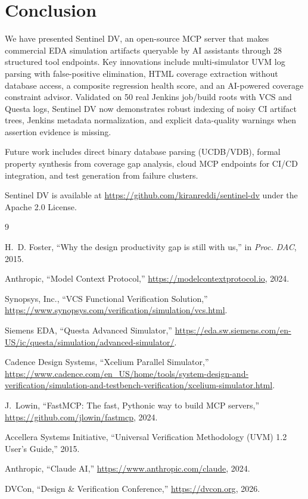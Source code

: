 \documentclass[10pt,twocolumn]{article}
\begin{document}
\section{Conclusion}

We have presented Sentinel DV, an open-source MCP server that makes commercial EDA
simulation artifacts queryable by AI assistants through 28 structured tool
endpoints. Key innovations include multi-simulator UVM log parsing with
false-positive elimination, HTML coverage extraction without database access, a
composite regression health score, and an AI-powered coverage constraint advisor.
Validated on 50 real Jenkins job/build roots with VCS and Questa logs, Sentinel
DV now demonstrates robust indexing of noisy CI artifact trees, Jenkins metadata
normalization, and explicit data-quality warnings when assertion evidence is
missing.

Future work includes direct binary database parsing (UCDB/VDB), formal property
synthesis from coverage gap analysis, cloud MCP endpoints for CI/CD integration,
and test generation from failure clusters.

Sentinel DV is available at \url{https://github.com/kiranreddi/sentinel-dv}
under the Apache 2.0 License.

\small
\begin{thebibliography}{9}

H.~D. Foster, ``Why the design productivity gap is still with us,''
in \textit{Proc. DAC}, 2015.

Anthropic, ``Model Context Protocol,'' \url{https://modelcontextprotocol.io}, 2024.

Synopsys, Inc., ``VCS Functional Verification Solution,''
\url{https://www.synopsys.com/verification/simulation/vcs.html}.

Siemens EDA, ``Questa Advanced Simulator,''
\url{https://eda.sw.siemens.com/en-US/ic/questa/simulation/advanced-simulator/}.

Cadence Design Systems, ``Xcelium Parallel Simulator,''
\url{https://www.cadence.com/en_US/home/tools/system-design-and-verification/simulation-and-testbench-verification/xcelium-simulator.html}.

J.~Lowin, ``FastMCP: The fast, Pythonic way to build MCP servers,''
\url{https://github.com/jlowin/fastmcp}, 2024.

Accellera Systems Initiative, ``Universal Verification Methodology (UVM) 1.2
User's Guide,'' 2015.

Anthropic, ``Claude AI,'' \url{https://www.anthropic.com/claude}, 2024.

DVCon, ``Design \& Verification Conference,''
\url{https://dvcon.org}, 2026.

\end{thebibliography}
\end{document}
